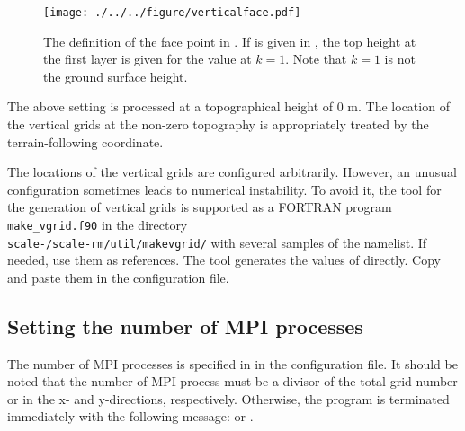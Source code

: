 \begin{figure}[tb]
\begin{center}
  \texttt{[image: ./../../figure/verticalface.pdf]}\\
  \caption{The definition of the face point in \scalerm. If  is given in , the top height at the first layer is given for the value at $k=1$. Note that $k=1$ is not the ground surface height.}
  \label{fig:scale_grid}
\end{center}
\end{figure}

The above setting is processed at a topographical height of 0 m.
The location of the vertical grids at the non-zero topography is appropriately treated by the terrain-following coordinate.

The locations of the vertical grids are configured arbitrarily.
However, an unusual configuration sometimes leads to numerical instability. To avoid it, the tool for the generation of vertical grids is supported as a FORTRAN program \verb|make_vgrid.f90| in the directory\\ \texttt{scale-\version/scale-rm/util/makevgrid/} with several samples of the namelist. If needed, use them as references. The tool generates the values of  directly. Copy and paste them in the configuration file.

\subsection{Setting the number of MPI processes} \label{subsec:relation_dom_reso2}

The number of MPI processes is specified in  in the configuration file.
It should be noted that the number of MPI process must be a divisor of the total grid number  or  in the x- and y-directions, respectively.
Otherwise, the program is terminated immediately with the following message:
or
.


